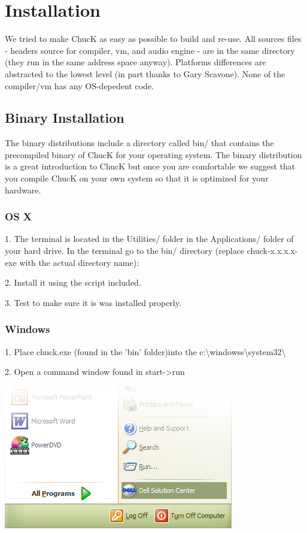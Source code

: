 \chapter{Installation}

We tried to make ChucK as easy as possible to build and re-use. All 
sources files - headers source for compiler, vm, and audio engine - are 
in the same directory (they run in the same address space anyway). Platforms 
differences are abstracted to the lowest level (in part thanks to Gary 
Scavone). None of the compiler/vm has any OS-depedent code. 

\section{Binary Installation}

The binary distributions include a directory called bin/ that contains the precompiled binary of ChucK for your operating system. The binary distribution is a great introduction to ChucK but once you are comfortable we suggest that you compile ChucK on your own system so that it is optimized for your hardware. 

\subsection{OS X}
1. The terminal is located in the Utilities/ folder in the Applications/ folder of your hard drive. In the terminal go to the bin/ directory (replace chuck-x.x.x.x-exe with the actual directory name):


2. Install it using the script included.


3. Test to make sure it is was installed properly.



\subsection{Windows}

1. Place chuck.exe (found in the 'bin' folder)into the c:\textbackslash windowss\textbackslash system32\textbackslash

2. Open a command window found in start-\textgreater run

\includegraphics{images/startmenu}

